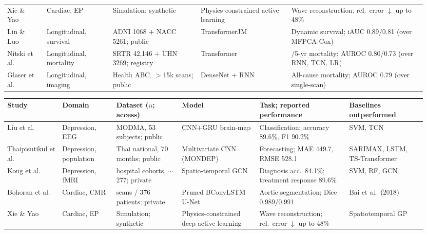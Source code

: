 \documentclass[journal]{IEEEtran}
\begin{document}
\begin{table}[t]
\begin{tabularx}{\textwidth}{>{\raggedright\arraybackslash}p{2.5cm} >{\raggedright\arraybackslash}p{2.2cm} >{\raggedright\arraybackslash}p{2.9cm} >{\raggedright\arraybackslash}p{2.7cm} >{\raggedright\arraybackslash}X}
\addlinespace[1pt]
Xie \& Yao~\cite{7} & Cardiac, EP & Simulation; synthetic & Physics-constrained active learning & Wave reconstruction; rel.\ error $\downarrow$ up to 48\% \\
\addlinespace[1pt]
Lin \& Luo~\cite{lin2022deep} & Longitudinal, survival & ADNI 1068 $+$ NACC 5261; public & TransformerJM & Dynamic survival; iAUC 0.89/0.81 (over MFPCA-Cox) \\
\addlinespace[1pt]
Nitski et al.~\cite{nitski2021long} & Longitudinal, mortality & SRTR 42{,}146 $+$ UHN 3269; registry & Transformer & 1/5-yr mortality; AUROC 0.80/0.73 (over RNN, TCN, LR) \\
\addlinespace[1pt]
Glaser et al.~\cite{glaser2022deep} & Longitudinal, imaging & Health ABC, $>$15k scans; public & DenseNet $+$ RNN & All-cause mortality; AUROC 0.79 (over single-scan) \\
\bottomrule
\end{tabularx}
\else
\scriptsize
\setlength{\tabcolsep}{3pt}
\renewcommand{\arraystretch}{1.15}
\begin{tabularx}{\textwidth}{>{\raggedright\arraybackslash}p{1.7cm} >{\raggedright\arraybackslash}p{1.5cm} >{\raggedright\arraybackslash}p{2.9cm} >{\raggedright\arraybackslash}p{2.6cm} >{\raggedright\arraybackslash}X >{\raggedright\arraybackslash}p{2.5cm}}
\toprule
\textbf{Study} & \textbf{Domain} & \textbf{Dataset ($n$; access)} & \textbf{Model} & \textbf{Task; reported performance} & \textbf{Baselines outperformed} \\
\midrule
Liu et al.~\cite{2} & Depression, EEG & MODMA, 53 subjects; public & CNN$+$GRU brain-map & Classification; accuracy 89.6\%, F1 90.2\% & SVM, TCN \\
\addlinespace[1pt]
Thaipisutikul et al.~\cite{3} & Depression, population & Thai national, 70 months; public & Multivariate CNN (MONDEP) & Forecasting; MAE 449.7, RMSE 528.1 & SARIMAX, LSTM, TS-Transformer \\
\addlinespace[1pt]
Kong et al.~\cite{4} & Depression, fMRI & 2 hospital cohorts, $\sim$277; private & Spatio-temporal GCN & Diagnosis acc.\ 84.1\%; treatment response 89.6\% & SVM, RF, GCN \\
\addlinespace[1pt]
Bohoran et al.~\cite{5} & Cardiac, CMR & 424 scans / 376 patients; private & Pruned BConvLSTM U-Net & Aortic segmentation; Dice 0.989/0.991 & Bai et al.\ (2018) \\
\addlinespace[1pt]
Xie \& Yao~\cite{7} & Cardiac, EP & Simulation; synthetic & Physics-constrained deep active learning & Wave reconstruction; rel.\ error $\downarrow$ up to 48\% & Spatiotemporal GP \\

\end{tabularx}
\end{table}
\end{document}
